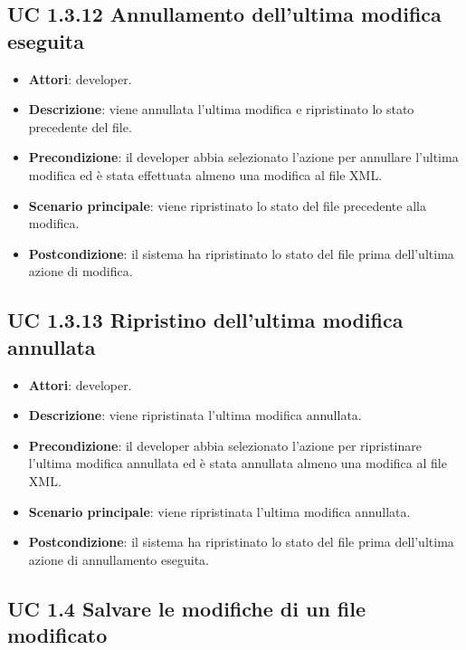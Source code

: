 	\subsection{UC 1.3.12 Annullamento dell'ultima modifica eseguita}
		\label{subsec:XEUC1.3.12}
		
		\begin{itemize}
			\item\textbf{Attori}: developer.
			\item\textbf{Descrizione}: viene annullata l'ultima modifica e ripristinato lo stato precedente del file.
			\item\textbf{Precondizione}: il developer abbia selezionato l'azione per annullare l'ultima modifica ed è stata effettuata almeno una modifica al file XML.
			\item\textbf{Scenario principale}: viene ripristinato lo stato del file precedente alla modifica.
			\item\textbf{Postcondizione}: il sistema ha ripristinato lo stato del file prima dell'ultima azione di modifica.
		\end{itemize}
		
	\subsection{UC 1.3.13 Ripristino dell'ultima modifica annullata}
		\label{subsec:XEUC1.3.13}
		
		\begin{itemize}
			\item\textbf{Attori}: developer.
			\item\textbf{Descrizione}: viene ripristinata l'ultima modifica annullata.
			\item\textbf{Precondizione}: il developer abbia selezionato l'azione per ripristinare l'ultima modifica annullata ed è stata annullata almeno una modifica al file XML.
			\item\textbf{Scenario principale}: viene ripristinata l'ultima modifica annullata.
			\item\textbf{Postcondizione}: il sistema ha ripristinato lo stato del file prima dell'ultima azione di annullamento eseguita.
		\end{itemize}
		
	\subsection{UC 1.4 Salvare le modifiche di un file modificato}
		\label{subsec:XEUC1.4}
			
